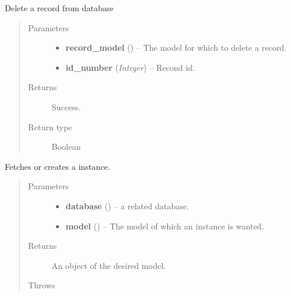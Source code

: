 \documentclass[letterpaper,10pt,english]{sphinxmanual}
\begin{document}
\begin{fulllineitems}
\label{controller:controller.common.delete_record}
Delete a record from database
\begin{quote}\begin{description}
\item[{Parameters}] \leavevmode\begin{itemize}
\item {} 
\textbf{record\_model} () -- The model for which to delete a record.

\item {} 
\textbf{id\_number} (\emph{Integer}) -- Recond id.

\end{itemize}

\item[{Returns}] \leavevmode
Success.

\item[{Return type}] \leavevmode
Boolean

\end{description}\end{quote}

\end{fulllineitems}


\begin{fulllineitems}
\label{controller:controller.common.get_or_create}
Fetches or creates a instance.
\begin{quote}\begin{description}
\item[{Parameters}] \leavevmode\begin{itemize}
\item {} 
\textbf{database} () -- a related database.

\item {} 
\textbf{model} () -- The model of which an instance is wanted.

\end{itemize}

\item[{Returns}] \leavevmode
An object of the desired model.

\item[{Throws }] \leavevmode
{}

\end{description}\end{quote}

\end{fulllineitems}
\end{document}

